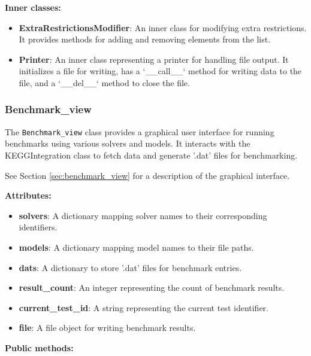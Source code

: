 \textbf {Inner classes:}

\begin{itemize}
    \item \textbf{ExtraRestrictionsModifier}: An inner class for modifying extra restrictions. It provides methods for adding and removing elements from the list.
    \item \textbf{Printer}: An inner class representing a printer for handling file output. It initializes a file for writing, has a `\_\_call\_\_` method for writing data to the file, and a `\_\_del\_\_` method to close the file.
\end{itemize}



\subsubsection{Benchmark\_view}

The \texttt{Benchmark\_view} class provides a graphical user interface for running benchmarks using various solvers and models. It interacts with the KEGGIntegration class to fetch data and generate '.dat' files for benchmarking.

See Section \ref{sec:benchmark_view} for a description of the graphical interface.

\textbf{Attributes:}

\begin{itemize}
    \item \textbf{solvers}: A dictionary mapping solver names to their corresponding identifiers.
    \item \textbf{models}: A dictionary mapping model names to their file paths.
    \item \textbf{dats}: A dictionary to store '.dat' files for benchmark entries.
    \item \textbf{result\_count}: An integer representing the count of benchmark results.
    \item \textbf{current\_test\_id}: A string representing the current test identifier.
    \item \textbf{file}: A file object for writing benchmark results.
\end{itemize}

\textbf{Public methods:}


